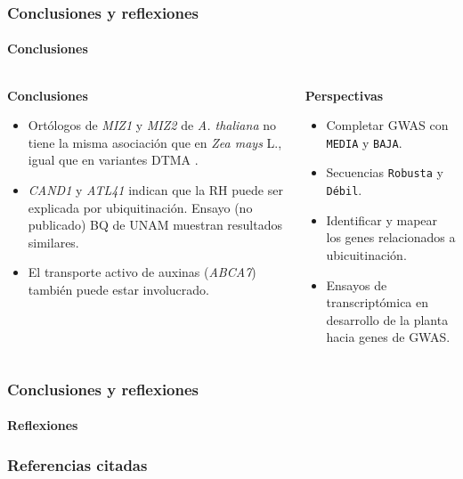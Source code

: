 \documentclass[9pt,aspectratio=169]{beamer}
\newcommand{\usageitem}[1]{
  \item[ {\makebox[2em]{\strut #1}} ]
}
\newcommand{\conclusion}{ \usageitem{\centering\color{ITESOblue}\faArrowCircleRight} }
\newcommand{\plus}{ \usageitem{\centering\color{ITESOblue}\faPlusCircle} }
\begin{document}
\begin{frame}
   \frametitle{Conclusiones y reflexiones} 
    \framesubtitle{Conclusiones}

\begin{columns}[t]
    \begin{column}{0.45\textwidth}
    {\Large\textbf{Conclusiones}}
        \begin{itemize}
            \conclusion Ortólogos de \textit{MIZ1} y \textit{MIZ2} de \textit{A. thaliana} no tiene la misma asociación que en \textit{Zea mays} L., igual que en variantes DTMA \cite{guadarrama-2019-gwas}.
            \conclusion \textit{CAND1} y \textit{ATL41} indican que la RH puede ser explicada por \colorbox[HTML]{FFFFC7}{ubiquitinación}. Ensayo (no publicado) BQ de UNAM muestran resultados similares.
            \conclusion El transporte activo de \colorbox[HTML]{ECF4FF}{auxinas} (\textit{ABCA7}) también puede estar involucrado. 
        \end{itemize}
    \end{column}

    \begin{column}{0.45\textwidth}
    {\Large\textbf{Perspectivas}}
        \begin{itemize}
            \plus Completar GWAS con \texttt{MEDIA} y \texttt{BAJA}.
            \plus Secuencias \texttt{Robusta} y \texttt{Débil}.
            \plus Identificar y mapear los genes relacionados a ubicuitinación.
            \plus Ensayos de transcriptómica en desarrollo de la planta hacia genes de GWAS.
        \end{itemize} 
    \end{column}
\end{columns}

\end{frame}

\begin{frame}
   \frametitle{Conclusiones y reflexiones} 
    \framesubtitle{Reflexiones}

    \begin{center}
        {\LARGE\bfseries {} }
    \end{center}
\end{frame}

\begin{frame}
    \frametitle{Referencias citadas}
    \begin{multicols}{2}
        \printbibliography
    \end{multicols}
\end{frame}
\end{document}
